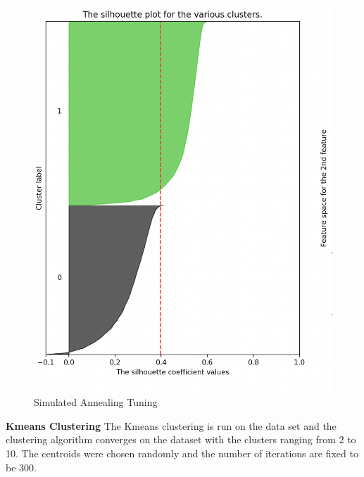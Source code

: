 \documentclass[a4paper,12pt]{article}
\begin{document}
\begin{figure}[!htb]
\begin{minipage}{0.33\textwidth}
     \end{minipage}\hfill
     \begin{minipage}{0.33\textwidth}
     \centering
     \includegraphics[width=.95\linewidth]{kmeans_sil_22}
   \end{minipage}\hfill
 \caption { Simulated Annealing Tuning}
\end{figure}
\textbf{ Kmeans Clustering} The Kmeans clustering is run on the data set and the clustering algorithm converges on the dataset with the clusters ranging from 2 to 10. The centroids were chosen randomly  and the number of iterations are fixed to be 300. \newline
\end{document}
